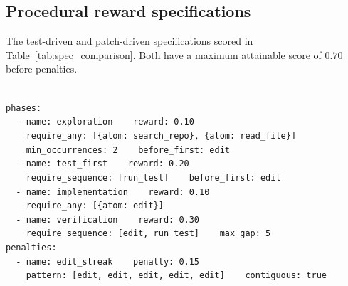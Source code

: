 \documentclass[11pt]{article}
\begin{document}
    \subsection{Procedural reward specifications}
  The test-driven and patch-driven specifications scored in Table~\ref{tab:spec_comparison}. Both have a maximum attainable
  score of $0.70$ before penalties.
  \\
  \\
  \begin{tcolorbox}[
    colback=black!3,
    colframe=black!30,
    boxrule=0.4pt,
    left=10pt,
    right=10pt,
    top=8pt,
    bottom=8pt,
    fontupper=\small,
    title=\texttt{test\_driven},
    coltitle=black!75,
    colbacktitle=black!8,
    fonttitle=\small,
    before skip=0pt,
    after skip=0pt
  ]
  \texttt{phases:}\\
  \texttt{~~- name: exploration~~~~reward: 0.10}\\
  \texttt{~~~~require\_any: [\{atom: search\_repo\}, \{atom: read\_file\}]}\\
  \texttt{~~~~min\_occurrences: 2~~~~before\_first: edit}\\
  \texttt{~~- name: test\_first~~~~reward: 0.20}\\
  \texttt{~~~~require\_sequence: [run\_test]~~~~before\_first: edit}\\
  \texttt{~~- name: implementation~~~~reward: 0.10}\\
  \texttt{~~~~require\_any: [\{atom: edit\}]}\\
  \texttt{~~- name: verification~~~~reward: 0.30}\\
  \texttt{~~~~require\_sequence: [edit, run\_test]~~~~max\_gap: 5}\\
  \texttt{penalties:}\\
  \texttt{~~- name: edit\_streak~~~~penalty: 0.15}\\
  \texttt{~~~~pattern: [edit, edit, edit, edit, edit]~~~~contiguous: true}
  \end{tcolorbox}%
\end{document}
